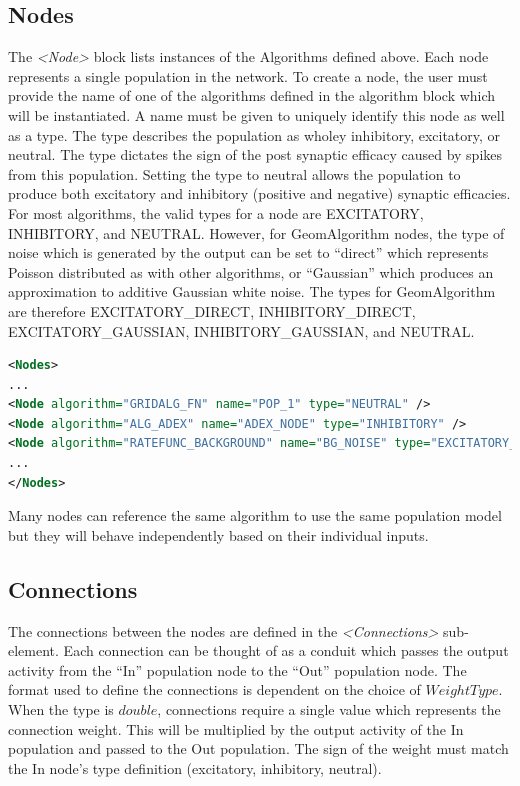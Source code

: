 \documentclass[utf8]{frontiersSCNS} %
\begin{document}
\subsection{Nodes}

The \textit{\textless Node\textgreater} block lists instances of the Algorithms defined above. Each node represents a single population in the network. To create a node, the user must provide the name of one of the algorithms defined in the algorithm block which will be instantiated. A name must be given to uniquely identify this node as well as a type. The type describes the population as wholey inhibitory, excitatory, or neutral. The type dictates the sign of the post synaptic efficacy caused by spikes from this population. Setting the type to neutral allows the population to produce both excitatory and inhibitory (positive and negative) synaptic efficacies. For most algorithms, the valid types for a node are EXCITATORY, INHIBITORY, and NEUTRAL. However, for GeomAlgorithm nodes, the type of noise which is generated by the output can be set to ``direct'' which represents Poisson distributed as with other algorithms, or ``Gaussian'' which produces an approximation to additive Gaussian white noise. The types for GeomAlgorithm are therefore EXCITATORY\_DIRECT, INHIBITORY\_DIRECT, EXCITATORY\_GAUSSIAN, INHIBITORY\_GAUSSIAN, and NEUTRAL.

\begin{lstlisting}[language=xml]
<Nodes>
...
<Node algorithm="GRIDALG_FN" name="POP_1" type="NEUTRAL" />
<Node algorithm="ALG_ADEX" name="ADEX_NODE" type="INHIBITORY" />
<Node algorithm="RATEFUNC_BACKGROUND" name="BG_NOISE" type="EXCITATORY_DIRECT" />
...
</Nodes>
\end{lstlisting}

Many nodes can reference the same algorithm to use the same population model but they will behave independently based on their individual inputs.\\

\subsection{Connections}

The connections between the nodes are defined in the \textit{\textless Connections\textgreater} sub-element. Each connection can be thought of as a conduit which passes the output activity from the ``In'' population node to the ``Out'' population node. The format used to define the connections is dependent on the choice of $WeightType$. When the type is $double$, connections require a single value which represents the connection weight. This will be multiplied by the output activity of the In population and passed to the Out population. The sign of the weight must match the In node’s type definition (excitatory, inhibitory, neutral).
\end{document}
